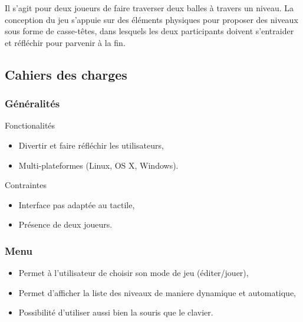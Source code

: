 Il s’agit pour deux joueurs de faire traverser deux
balles à travers un niveau.
La conception du jeu s’appuie sur des éléments physiques pour proposer des
niveaux sous forme de casse-têtes, dans lesquels les deux participants doivent
s’entraider et réfléchir pour parvenir à la fin.

%
\subsection {Cahiers des charges}


\subsubsection{Généralités}

    Fonctionalités
    \begin {itemize}
        \item Divertir et faire réfléchir les utilisateurs,
        \item Multi-plateformes (Linux, OS X, Windows).
    \end {itemize}
    Contraintes
    \begin{itemize}
        \item Interface pas adaptée au tactile,
        \item Présence de deux joueurs.
    \end {itemize}

\subsubsection {Menu}

\begin{itemize}
    \item Permet à l'utilisateur de choisir son mode de jeu (éditer/jouer),
    \item Permet d'afficher la liste des niveaux de maniere dynamique et automatique,
    \item Possibilité d'utiliser aussi bien la souris que le clavier.
\end{itemize}


